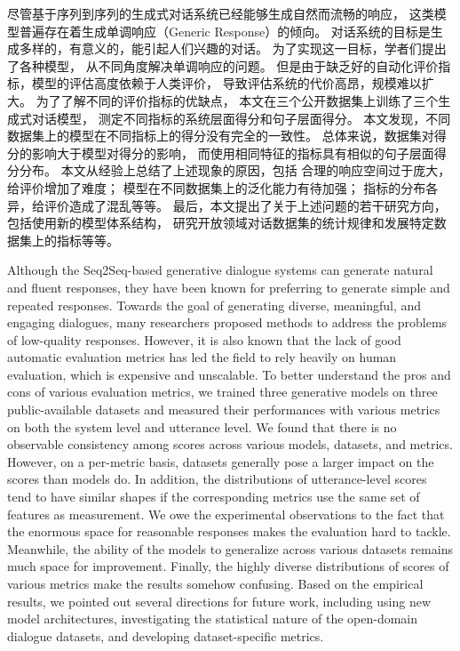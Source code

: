\begin{cabstract}
    尽管基于序列到序列的生成式对话系统已经能够生成自然而流畅的响应，
    这类模型普遍存在着生成单调响应（Generic Response）的倾向。
    对话系统的目标是生成多样的，有意义的，能引起人们兴趣的对话。
    为了实现这一目标，学者们提出了各种模型，
    从不同角度解决单调响应的问题。
    但是由于缺乏好的自动化评价指标，模型的评估高度依赖于人类评价，
    导致评估系统的代价高昂，规模难以扩大。
    为了了解不同的评价指标的优缺点，
    本文在三个公开数据集上训练了三个生成式对话模型，
    测定不同指标的系统层面得分和句子层面得分。
    本文发现，不同数据集上的模型在不同指标上的得分没有完全的一致性。
    总体来说，数据集对得分的影响大于模型对得分的影响，
    而使用相同特征的指标具有相似的句子层面得分分布。
    本文从经验上总结了上述现象的原因，包括
    合理的响应空间过于庞大，给评价增加了难度；
    模型在不同数据集上的泛化能力有待加强；
    指标的分布各异，给评价造成了混乱等等。
    最后，本文提出了关于上述问题的若干研究方向，
    包括使用新的模型体系结构，
    研究开放领域对话数据集的统计规律和发展特定数据集上的指标等等。
\end{cabstract}

\begin{eabstract}
    Although the Seq2Seq-based generative dialogue systems can generate natural and fluent responses, they have been known for preferring to generate simple and repeated responses. Towards the goal of generating diverse, meaningful, and engaging dialogues, many researchers proposed methods to address the problems of low-quality responses. However, it is also known that the lack of good automatic evaluation metrics has led the field to rely heavily on human evaluation, which is expensive and unscalable. To better understand the pros and cons of various evaluation metrics, we trained three generative models on three public-available datasets and measured their performances with various metrics on both the system level and utterance level. We found that there is no observable consistency among scores across various models, datasets, and metrics. However, on a per-metric basis, datasets generally pose a larger impact on the scores than models do. In addition, the distributions of utterance-level scores tend to have similar shapes if the corresponding metrics use the same set of features as measurement. We owe the experimental observations to the fact that the enormous space for reasonable responses makes the evaluation hard to tackle. Meanwhile, the ability of the models to generalize across various datasets remains much space for improvement. Finally, the highly diverse distributions of scores of various metrics make the results somehow confusing. Based on the empirical results, we pointed out several directions for future work, including using new model architectures, investigating the statistical nature of the open-domain dialogue datasets, and developing dataset-specific metrics.
\end{eabstract}

